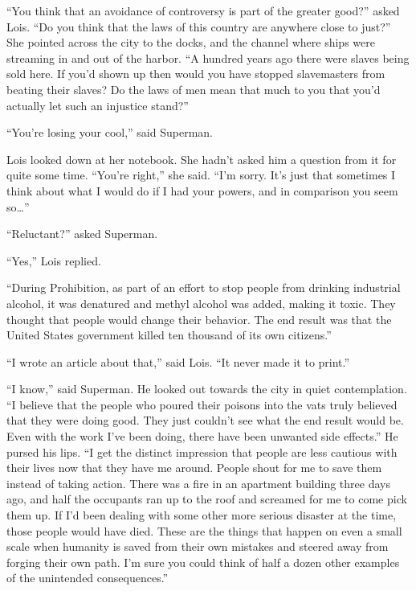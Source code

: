 \documentclass[ebook,12pt]{memoir}
\begin{document}
``You think that an avoidance of controversy is part of the greater
good?'' asked Lois. ``Do you think that the laws of this country are
anywhere close to just?'' She pointed across the city to the docks, and
the channel where ships were streaming in and out of the harbor. ``A
hundred years ago there were slaves being sold here. If you'd shown up
then would you have stopped slavemasters from beating their slaves? Do
the laws of men mean that much to you that you'd actually let such an
injustice stand?''

``You're losing your cool,'' said Superman.

Lois looked down at her notebook. She hadn't asked him a question from
it for quite some time. ``You're right,'' she said. ``I'm sorry. It's
just that sometimes I think about what I would do if I had your powers,
and in comparison you seem so\ldots{}''

``Reluctant?'' asked Superman.

``Yes,'' Lois replied.

``During Prohibition, as part of an effort to stop people from drinking
industrial alcohol, it was denatured and methyl alcohol was added,
making it toxic. They thought that people would change their behavior.
The end result was that the United States government killed ten thousand
of its own citizens.''

``I wrote an article about that,'' said Lois. ``It never made it to
print.''

``I know,'' said Superman. He looked out towards the city in quiet
contemplation. ``I believe that the people who poured their poisons into
the vats truly believed that they were doing good. They just couldn't
see what the end result would be. Even with the work I've been doing,
there have been unwanted side effects.'' He pursed his lips. ``I get the
distinct impression that people are less cautious with their lives now
that they have me around. People shout for me to save them instead of
taking action. There was a fire in an apartment building three days ago,
and half the occupants ran up to the roof and screamed for me to come
pick them up. If I'd been dealing with some other more serious disaster
at the time, those people would have died. These are the things that
happen on even a small scale when humanity is saved from their own
mistakes and steered away from forging their own path. I'm sure you
could think of half a dozen other examples of the unintended
consequences.''
\end{document}
